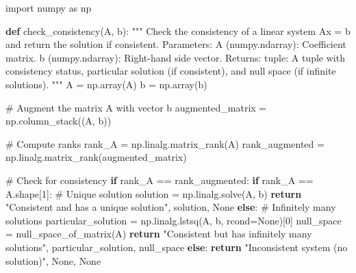 \documentclass[
  letterpaper,
  DIV=11,
  numbers=noendperiod]{scrreprt}
\newenvironment{Shaded}{\begin{snugshade}}{\end{snugshade}}
\newcommand{\CommentTok}[1]{\textcolor[rgb]{0.37,0.37,0.37}{#1}}
\newcommand{\ControlFlowTok}[1]{\textcolor[rgb]{0.00,0.23,0.31}{\textbf{#1}}}
\newcommand{\DecValTok}[1]{\textcolor[rgb]{0.68,0.00,0.00}{#1}}
\newcommand{\ImportTok}[1]{\textcolor[rgb]{0.00,0.46,0.62}{#1}}
\newcommand{\KeywordTok}[1]{\textcolor[rgb]{0.00,0.23,0.31}{\textbf{#1}}}
\newcommand{\NormalTok}[1]{\textcolor[rgb]{0.00,0.23,0.31}{#1}}
\newcommand{\OperatorTok}[1]{\textcolor[rgb]{0.37,0.37,0.37}{#1}}
\newcommand{\StringTok}[1]{\textcolor[rgb]{0.13,0.47,0.30}{#1}}
\newcommand{\VariableTok}[1]{\textcolor[rgb]{0.07,0.07,0.07}{#1}}
\theoremstyle{plain}
\theoremstyle{definition}
\theoremstyle{remark}
\begin{document}
\begin{Shaded}
\begin{Highlighting}[]
\ImportTok{import}\NormalTok{ numpy }\ImportTok{as}\NormalTok{ np}

\KeywordTok{def}\NormalTok{ check\_consistency(A, b):}
    \CommentTok{"""}
\CommentTok{    Check the consistency of a linear system Ax = b and return the solution if consistent.}
\CommentTok{    }
\CommentTok{    Parameters:}
\CommentTok{    A (numpy.ndarray): Coefficient matrix.}
\CommentTok{    b (numpy.ndarray): Right{-}hand side vector.}
\CommentTok{    }
\CommentTok{    Returns:}
\CommentTok{    tuple: A tuple with consistency status, particular solution (if consistent), and null space (if infinite solutions).}
\CommentTok{    """}
\NormalTok{    A }\OperatorTok{=}\NormalTok{ np.array(A)}
\NormalTok{    b }\OperatorTok{=}\NormalTok{ np.array(b)}
    
    \CommentTok{\# Augment the matrix A with vector b}
\NormalTok{    augmented\_matrix }\OperatorTok{=}\NormalTok{ np.column\_stack((A, b))}
    
    \CommentTok{\# Compute ranks}
\NormalTok{    rank\_A }\OperatorTok{=}\NormalTok{ np.linalg.matrix\_rank(A)}
\NormalTok{    rank\_augmented }\OperatorTok{=}\NormalTok{ np.linalg.matrix\_rank(augmented\_matrix)}
    
    \CommentTok{\# Check for consistency}
    \ControlFlowTok{if}\NormalTok{ rank\_A }\OperatorTok{==}\NormalTok{ rank\_augmented:}
        \ControlFlowTok{if}\NormalTok{ rank\_A }\OperatorTok{==}\NormalTok{ A.shape[}\DecValTok{1}\NormalTok{]:}
            \CommentTok{\# Unique solution}
\NormalTok{            solution }\OperatorTok{=}\NormalTok{ np.linalg.solve(A, b)}
            \ControlFlowTok{return} \StringTok{"Consistent and has a unique solution"}\NormalTok{, solution, }\VariableTok{None}
        \ControlFlowTok{else}\NormalTok{:}
            \CommentTok{\# Infinitely many solutions}
\NormalTok{            particular\_solution }\OperatorTok{=}\NormalTok{ np.linalg.lstsq(A, b, rcond}\OperatorTok{=}\VariableTok{None}\NormalTok{)[}\DecValTok{0}\NormalTok{]}
\NormalTok{            null\_space }\OperatorTok{=}\NormalTok{ null\_space\_of\_matrix(A)}
            \ControlFlowTok{return} \StringTok{"Consistent but has infinitely many solutions"}\NormalTok{, particular\_solution, null\_space}
    \ControlFlowTok{else}\NormalTok{:}
        \ControlFlowTok{return} \StringTok{"Inconsistent system (no solution)"}\NormalTok{, }\VariableTok{None}\NormalTok{, }\VariableTok{None}


\end{Highlighting}
\end{Shaded}
\end{document}
